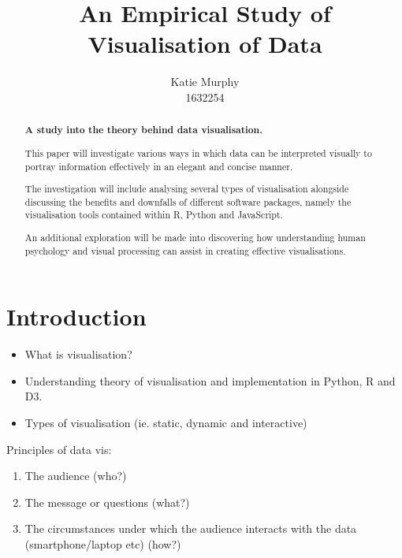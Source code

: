 \documentclass[12pt]{article}
\title{\textbf{An Empirical Study of Visualisation of Data}}
\author{Katie Murphy \\ 1632254}
\begin{document}
\maketitle

\begin{abstract}

    \begin{center}
        \noindent \textbf{A study into the theory behind data visualisation.} 
        
         \vspace{0.3cm}
        
        \noindent This paper will investigate various ways in which data can be interpreted visually to portray information effectively in an elegant and concise manner. 
        
        \vspace{0.3cm}
        
        \noindent The investigation will include analysing several types of visualisation alongside discussing the benefits and downfalls of different software packages, namely the visualisation tools contained within R, Python and JavaScript.
        
        \vspace{0.3cm}
        
        An additional exploration will be made into discovering how understanding human psychology and visual processing can assist in creating effective visualisations.
        
    
    \end{center}    
     
    \end{abstract}


    \newpage


    \section{Introduction}
    
    \begin{itemize}
    \item What is visualisation?
    \item Understanding theory of visualisation and implementation in Python, R and D3.
    \item Types of visualisation (ie. static, dynamic and interactive)
    \end{itemize}
    
    Principles of data vis:
    \begin{enumerate}
        \item The audience (who?)
        \item The message or questions (what?)
        \item The circumstances under which the audience interacts with the data (smartphone/laptop etc) (how?)
    \end{enumerate}
    
\end{document}
